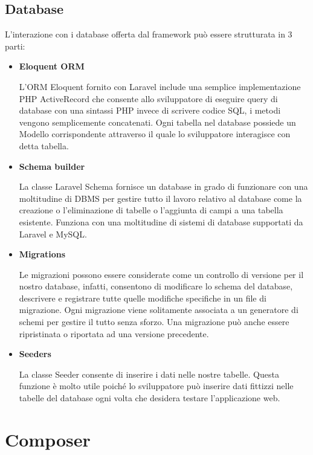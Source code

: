\subsection{Database}
L'interazione con i database offerta dal framework\citep{rif17} può essere strutturata in 3 parti:
\begin{itemize}
	\item \textbf{Eloquent ORM}
	
	L'ORM Eloquent fornito con Laravel include una semplice implementazione PHP ActiveRecord che consente allo sviluppatore di eseguire query di database con una sintassi PHP invece di scrivere codice SQL, i metodi vengono semplicemente concatenati. Ogni tabella nel database possiede un Modello corrispondente attraverso il quale lo sviluppatore interagisce con detta tabella.
	
	\item \textbf{Schema builder}
	
	La classe Laravel Schema fornisce un database in grado di funzionare con una moltitudine di DBMS per gestire tutto il lavoro relativo al database come la creazione o l'eliminazione di tabelle o l'aggiunta di campi a una tabella esistente. Funziona con una moltitudine di sistemi di database supportati da Laravel e MySQL.
	
	\item \textbf{Migrations}
	
	Le migrazioni possono essere considerate come un controllo di versione per il nostro database, infatti, consentono di modificare lo schema del database, descrivere e registrare tutte quelle modifiche specifiche in un file di migrazione. Ogni migrazione viene solitamente associata a un generatore di schemi per gestire il tutto senza sforzo. Una migrazione può anche essere ripristinata o riportata ad una versione precedente.
	
	\item \textbf{Seeders}
	
	La classe Seeder consente di inserire i dati nelle nostre tabelle. Questa funzione è molto utile poiché lo sviluppatore può inserire dati fittizzi nelle tabelle del database ogni volta che desidera testare l'applicazione web.
	
\end{itemize}

\section{Composer}

